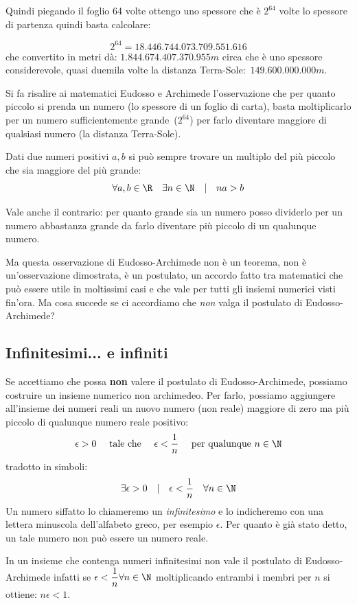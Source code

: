 Quindi piegando il foglio 64 volte ottengo uno spessore che è $2^{64}$ 
volte 
lo spessore di partenza quindi basta calcolare:

\[2^{64} = 18.446.744.073.709.551.616\]
che convertito in metri dà: $1.844.674.407.370.955m$ circa che è uno 
spessore considerevole, quasi duemila volte la distanza 
Terra-Sole:~$149.600.000.000m$.

Si fa risalire ai matematici Eudosso e Archimede l'osservazione che per 
quanto piccolo si prenda un numero (lo spessore di un foglio di carta), 
basta moltiplicarlo per un numero sufficientemente grande~($2^{64}$) per 
farlo diventare maggiore di qualsiasi numero (la distanza Terra-Sole).

\begin{postulato}
Dati due numeri positivi \(a, b\) si può sempre trovare un 
multiplo del più piccolo che sia maggiore del più grande:
\[\forall a, b \in \R \quad \exists n \in \N \quad | \quad na>b\]
\end{postulato}

Vale anche il contrario: per quanto grande sia un numero posso dividerlo 
per un numero abbastanza grande da farlo diventare più piccolo di un 
qualunque numero.

Ma questa osservazione di Eudosso-Archimede non è un teorema, non è 
un'osservazione dimostrata, è un postulato, un accordo fatto tra matematici 
che può essere utile in moltissimi casi e che vale per tutti gli insiemi 
numerici visti fin'ora. 
Ma cosa succede se ci accordiamo che \emph{non} valga il postulato di 
Eudosso-Archimede?

\subsection{Infinitesimi... e infiniti}
\label{subsec:insnum_nonarchimedei}

Se accettiamo che possa \textbf{non} valere il postulato di 
Eudosso-Archimede, possiamo costruire un insieme numerico non archimedeo. 
Per farlo, possiamo aggiungere all'insieme dei numeri reali un nuovo numero 
(non reale) maggiore di zero ma più piccolo di qualunque numero reale 
positivo:
\[\epsilon > 0 \quad \text{ tale che } \quad 
\epsilon < \frac{1}{n} \quad \text{ per qualunque } n \in \N\]
tradotto in simboli:
\[\exists \epsilon > 0 \quad | \quad \epsilon < \frac{1}{n} \quad \forall n 
\in \N\]
Un numero siffatto lo chiameremo un \emph{infinitesimo} e lo indicheremo 
con una lettera minuscola dell'alfabeto greco, per esempio $\epsilon$.
Per quanto è già stato detto, un tale numero non può essere un numero
reale. 
\begin{osservazione}
 In un insieme che contenga numeri infinitesimi non vale il postulato di 
Eudosso-Archimede infatti se
\(\epsilon < \dfrac{1}{n} \forall n \in \N\) 
moltiplicando entrambi i membri per \(n\) 
si ottiene: \(n \epsilon < 1\).
\end{osservazione}

